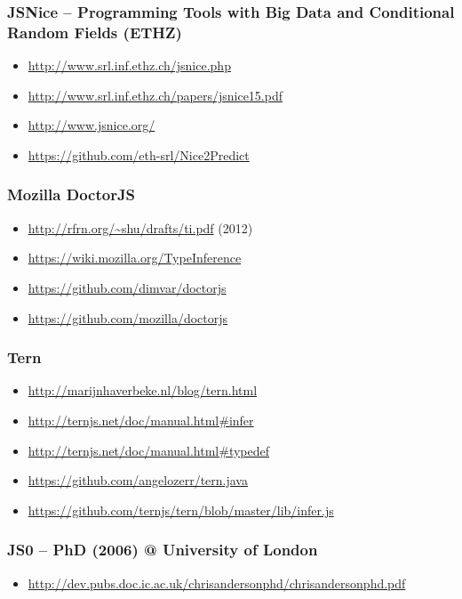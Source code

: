 \subsubsection{JSNice -- Programming Tools with Big Data and Conditional Random Fields (ETHZ)}
\begin{itemize}
 \item \url{http://www.srl.inf.ethz.ch/jsnice.php}
 \item \url{http://www.srl.inf.ethz.ch/papers/jsnice15.pdf}
 \item \url{http://www.jsnice.org/}
 \item \url{https://github.com/eth-srl/Nice2Predict}
\end{itemize}

\subsubsection{Mozilla DoctorJS}
\begin{itemize}
\item \url{http://rfrn.org/~shu/drafts/ti.pdf} (2012)
\item \url{https://wiki.mozilla.org/TypeInference}
\item \url{https://github.com/dimvar/doctorjs}
\item \url{https://github.com/mozilla/doctorjs}
\end{itemize}

\subsubsection{Tern}
\begin{itemize}
 \item \url{http://marijnhaverbeke.nl/blog/tern.html}
 \item \url{http://ternjs.net/doc/manual.html#infer}
 \item \url{http://ternjs.net/doc/manual.html#typedef}
 \item \url{https://github.com/angelozerr/tern.java}
 \item \url{https://github.com/ternjs/tern/blob/master/lib/infer.js}
\end{itemize}

\subsubsection{JS0 -- PhD (2006) @ University of London}
\begin{itemize}
 \item \url{http://dev.pubs.doc.ic.ac.uk/chrisandersonphd/chrisandersonphd.pdf}
\end{itemize}

